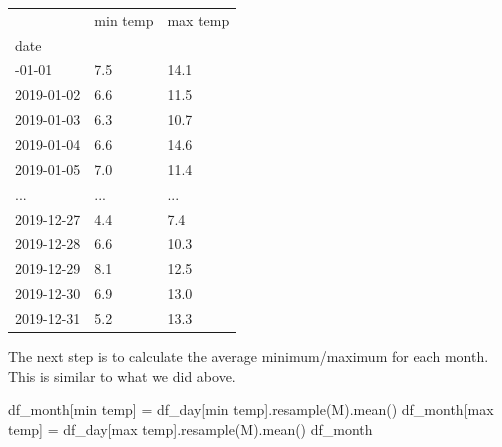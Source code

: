\documentclass[
  letterpaper,
  DIV=11,
  numbers=noendperiod,
  oneside]{scrreprt}
\newenvironment{Shaded}{\begin{snugshade}}{\end{snugshade}}
\newcommand{\NormalTok}[1]{\textcolor[rgb]{0.00,0.23,0.31}{#1}}
\newcommand{\OperatorTok}[1]{\textcolor[rgb]{0.37,0.37,0.37}{#1}}
\newcommand{\StringTok}[1]{\textcolor[rgb]{0.13,0.47,0.30}{#1}}
\begin{document}
\begin{longtable}[]{@{}lll@{}}
\toprule\noalign{}
& min temp & max temp \\
date & & \\
\midrule\noalign{}
\endhead
\bottomrule\noalign{}
\endlastfoot
2019-01-01 & 7.5 & 14.1 \\
2019-01-02 & 6.6 & 11.5 \\
2019-01-03 & 6.3 & 10.7 \\
2019-01-04 & 6.6 & 14.6 \\
2019-01-05 & 7.0 & 11.4 \\
... & ... & ... \\
2019-12-27 & 4.4 & 7.4 \\
2019-12-28 & 6.6 & 10.3 \\
2019-12-29 & 8.1 & 12.5 \\
2019-12-30 & 6.9 & 13.0 \\
2019-12-31 & 5.2 & 13.3 \\
\end{longtable}

The next step is to calculate the average minimum/maximum for each
month. This is similar to what we did above.

\begin{Shaded}
\begin{Highlighting}[]
\NormalTok{df\_month[}\StringTok{\textquotesingle{}min temp\textquotesingle{}}\NormalTok{] }\OperatorTok{=}\NormalTok{ df\_day[}\StringTok{\textquotesingle{}min temp\textquotesingle{}}\NormalTok{].resample(}\StringTok{\textquotesingle{}M\textquotesingle{}}\NormalTok{).mean()}
\NormalTok{df\_month[}\StringTok{\textquotesingle{}max temp\textquotesingle{}}\NormalTok{] }\OperatorTok{=}\NormalTok{ df\_day[}\StringTok{\textquotesingle{}max temp\textquotesingle{}}\NormalTok{].resample(}\StringTok{\textquotesingle{}M\textquotesingle{}}\NormalTok{).mean()}
\NormalTok{df\_month}
\end{Highlighting}
\end{Shaded}
\end{document}
